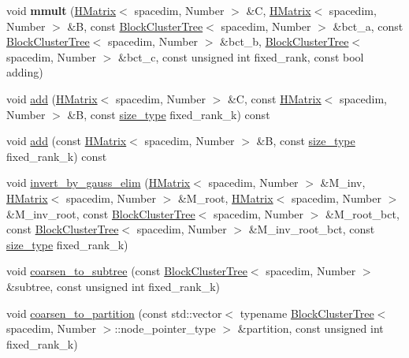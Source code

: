 \begin{DoxyCompactItemize}
\item 
\mbox{\label{classHMatrix_a4139e9069e3b18d4719c527ce2e0414c}} 
void {\bfseries mmult} (\hyperlink{classHMatrix}{H\+Matrix}$<$ spacedim, Number $>$ \&C, \hyperlink{classHMatrix}{H\+Matrix}$<$ spacedim, Number $>$ \&B, const \hyperlink{classBlockClusterTree}{Block\+Cluster\+Tree}$<$ spacedim, Number $>$ \&bct\+\_\+a, const \hyperlink{classBlockClusterTree}{Block\+Cluster\+Tree}$<$ spacedim, Number $>$ \&bct\+\_\+b, \hyperlink{classBlockClusterTree}{Block\+Cluster\+Tree}$<$ spacedim, Number $>$ \&bct\+\_\+c, const unsigned int fixed\+\_\+rank, const bool adding)
\item 
void \hyperlink{classHMatrix_a8f96186426cd3147d5af32ca84ad25ea}{add} (\hyperlink{classHMatrix}{H\+Matrix}$<$ spacedim, Number $>$ \&C, const \hyperlink{classHMatrix}{H\+Matrix}$<$ spacedim, Number $>$ \&B, const \hyperlink{classHMatrix_a5ca8dc549783d38371a01ecd621ecb34}{size\+\_\+type} fixed\+\_\+rank\+\_\+k) const
\item 
void \hyperlink{classHMatrix_a9bd48ada567962ab0dc75c31986bd1a6}{add} (const \hyperlink{classHMatrix}{H\+Matrix}$<$ spacedim, Number $>$ \&B, const \hyperlink{classHMatrix_a5ca8dc549783d38371a01ecd621ecb34}{size\+\_\+type} fixed\+\_\+rank\+\_\+k) const
\item 
void \hyperlink{classHMatrix_ab100d1469f662efdbf894a0345b702b8}{invert\+\_\+by\+\_\+gauss\+\_\+elim} (\hyperlink{classHMatrix}{H\+Matrix}$<$ spacedim, Number $>$ \&M\+\_\+inv, \hyperlink{classHMatrix}{H\+Matrix}$<$ spacedim, Number $>$ \&M\+\_\+root, \hyperlink{classHMatrix}{H\+Matrix}$<$ spacedim, Number $>$ \&M\+\_\+inv\+\_\+root, const \hyperlink{classBlockClusterTree}{Block\+Cluster\+Tree}$<$ spacedim, Number $>$ \&M\+\_\+root\+\_\+bct, const \hyperlink{classBlockClusterTree}{Block\+Cluster\+Tree}$<$ spacedim, Number $>$ \&M\+\_\+inv\+\_\+root\+\_\+bct, const \hyperlink{classHMatrix_a5ca8dc549783d38371a01ecd621ecb34}{size\+\_\+type} fixed\+\_\+rank\+\_\+k)
\item 
void \hyperlink{classHMatrix_a27c7390b792e6e47ab2861616a997d99}{coarsen\+\_\+to\+\_\+subtree} (const \hyperlink{classBlockClusterTree}{Block\+Cluster\+Tree}$<$ spacedim, Number $>$ \&subtree, const unsigned int fixed\+\_\+rank\+\_\+k)
\item 
void \hyperlink{classHMatrix_a525ad4d453f4f496b98cccb341c8b60b}{coarsen\+\_\+to\+\_\+partition} (const std\+::vector$<$ typename \hyperlink{classBlockClusterTree}{Block\+Cluster\+Tree}$<$ spacedim, Number $>$\+::node\+\_\+pointer\+\_\+type $>$ \&partition, const unsigned int fixed\+\_\+rank\+\_\+k)

\end{DoxyCompactItemize}
